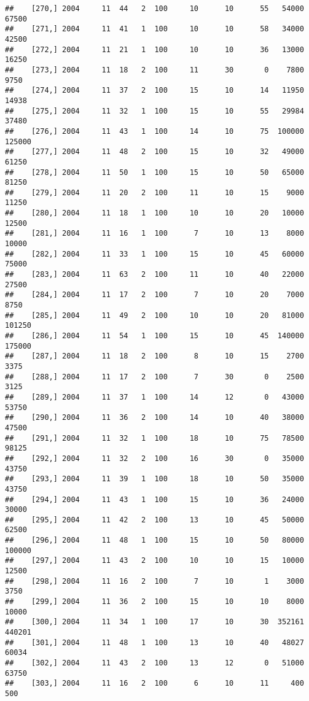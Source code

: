 \documentclass{article}\usepackage[]{graphicx}\usepackage[]{color}
\makeatletter
\newenvironment{kframe}{%
 \def\at@end@of@kframe{}%
 \ifinner\ifhmode%
  \def\at@end@of@kframe{\end{minipage}}%
  \begin{minipage}{\columnwidth}%
 \fi\fi%
 \def\FrameCommand##1{\hskip\@totalleftmargin \hskip-\fboxsep
 \colorbox{shadecolor}{##1}\hskip-\fboxsep
     \hskip-\linewidth \hskip-\@totalleftmargin \hskip\columnwidth}%
 \MakeFramed {\advance\hsize-\width
   \@totalleftmargin\z@ \linewidth\hsize
   \@setminipage}}%
 {\par\unskip\endMakeFramed%
 \at@end@of@kframe}
\newenvironment{knitrout}{}{} %
\makeatother
\begin{document}
\begin{knitrout}
\begin{kframe}
\begin{verbatim}
##    [270,] 2004     11  44   2  100     10      10      55   54000   67500
##    [271,] 2004     11  41   1  100     10      10      58   34000   42500
##    [272,] 2004     11  21   1  100     10      10      36   13000   16250
##    [273,] 2004     11  18   2  100     11      30       0    7800    9750
##    [274,] 2004     11  37   2  100     15      10      14   11950   14938
##    [275,] 2004     11  32   1  100     15      10      55   29984   37480
##    [276,] 2004     11  43   1  100     14      10      75  100000  125000
##    [277,] 2004     11  48   2  100     15      10      32   49000   61250
##    [278,] 2004     11  50   1  100     15      10      50   65000   81250
##    [279,] 2004     11  20   2  100     11      10      15    9000   11250
##    [280,] 2004     11  18   1  100     10      10      20   10000   12500
##    [281,] 2004     11  16   1  100      7      10      13    8000   10000
##    [282,] 2004     11  33   1  100     15      10      45   60000   75000
##    [283,] 2004     11  63   2  100     11      10      40   22000   27500
##    [284,] 2004     11  17   2  100      7      10      20    7000    8750
##    [285,] 2004     11  49   2  100     10      10      20   81000  101250
##    [286,] 2004     11  54   1  100     15      10      45  140000  175000
##    [287,] 2004     11  18   2  100      8      10      15    2700    3375
##    [288,] 2004     11  17   2  100      7      30       0    2500    3125
##    [289,] 2004     11  37   1  100     14      12       0   43000   53750
##    [290,] 2004     11  36   2  100     14      10      40   38000   47500
##    [291,] 2004     11  32   1  100     18      10      75   78500   98125
##    [292,] 2004     11  32   2  100     16      30       0   35000   43750
##    [293,] 2004     11  39   1  100     18      10      50   35000   43750
##    [294,] 2004     11  43   1  100     15      10      36   24000   30000
##    [295,] 2004     11  42   2  100     13      10      45   50000   62500
##    [296,] 2004     11  48   1  100     15      10      50   80000  100000
##    [297,] 2004     11  43   2  100     10      10      15   10000   12500
##    [298,] 2004     11  16   2  100      7      10       1    3000    3750
##    [299,] 2004     11  36   2  100     15      10      10    8000   10000
##    [300,] 2004     11  34   1  100     17      10      30  352161  440201
##    [301,] 2004     11  48   1  100     13      10      40   48027   60034
##    [302,] 2004     11  43   2  100     13      12       0   51000   63750
##    [303,] 2004     11  16   2  100      6      10      11     400     500

\end{verbatim}
\end{kframe}
\end{knitrout}
\end{document}

